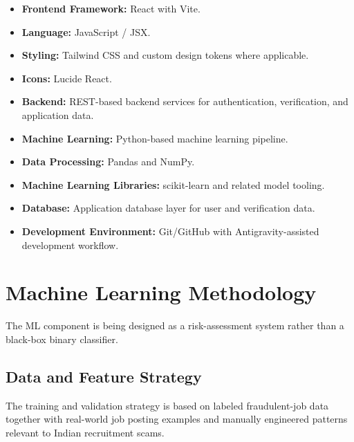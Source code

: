 \documentclass[12pt,a4paper]{report}
\begin{document}
\begin{itemize}

    \item \textbf{Frontend Framework:}
    React with Vite.

    \item \textbf{Language:}
    JavaScript / JSX.

    \item \textbf{Styling:}
    Tailwind CSS and custom design tokens where applicable.

    \item \textbf{Icons:}
    Lucide React.

    \item \textbf{Backend:}
    REST-based backend services for authentication, verification, and application data.

    \item \textbf{Machine Learning:}
    Python-based machine learning pipeline.

    \item \textbf{Data Processing:}
    Pandas and NumPy.

    \item \textbf{Machine Learning Libraries:}
    scikit-learn and related model tooling.

    \item \textbf{Database:}
    Application database layer for user and verification data.

    \item \textbf{Development Environment:}
    Git/GitHub with Antigravity-assisted development workflow.

\end{itemize}


\section{Machine Learning Methodology}

The ML component is being designed as a risk-assessment system rather than a black-box binary classifier.

\subsection{Data and Feature Strategy}

The training and validation strategy is based on labeled fraudulent-job data together with real-world job posting examples and manually engineered patterns relevant to Indian recruitment scams.
\end{document}

